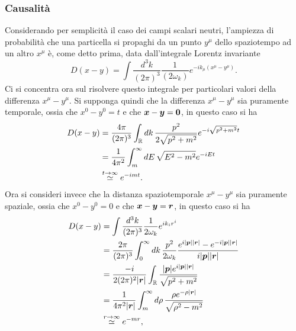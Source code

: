 \subsubsection{Causalità}
Considerando per semplicità il caso dei campi scalari neutri, l'ampiezza di probabilità che una particella si propaghi da un punto $y^\mu$ dello spaziotempo ad un altro $x^\mu$ è, come detto prima, data dall'integrale Lorentz invariante
\begin{equation}
\label{eq: propagatore libero campo scalare carico parziale}
    D(x - y) = \int\frac{d^3k}{(2\pi)^3}\frac{1}{(2\omega_k)}e^{-ik_\mu(x^\mu - y^\mu)}.
\end{equation}
Ci si concentra ora sul risolvere questo integrale per particolari valori della differenza $x^\mu - y^\mu$. Si supponga quindi che la differenza $x^\mu - y^\mu$ sia puramente temporale, ossia che $x^0 - y^0 = t$ e che $\bm{x} -\bm{y} = \bm{0}$, in questo caso si ha
\begin{equation}
    \begin{split}
        D(x - y) &= \frac{4\pi}{(2\pi)^{3}}\int_{\mathbb{R}} dk\,\frac{p^2}{2\sqrt{p^2 + m^2}}e^{-i\sqrt{p^2 + m^2}t} \\
        &=\frac{1}{4\pi^2}\int_m^\infty dE\, \sqrt{E^2 - m^2}e^{-iEt} \\
        &\overset{t\to\infty}{\simeq} e^{-imt}.
    \end{split}
\end{equation}
Ora si consideri invece che la distanza spaziotemporale $x^\mu - y^\mu$ sia puramente spaziale, ossia che $x^0 - y^0 = 0$ e che $\bm{x} -\bm{y} = \bm{r}$, in questo caso si ha
\begin{equation}
    \begin{split}
        D(x - y) &= \int\frac{d^3k}{(2\pi)^3}\frac{1}{2\omega_k}e^{ik_ir^i} \\
        &= \frac{2\pi}{(2\pi)^3}\int_0^\infty dk\,\frac{p^2}{2\omega_k}\frac{e^{i|\bm{p}||\bm{r}|} - e^{-i|\bm{p}||\bm{r}|}}{i|\bm{p}||\bm{r}|} \\ 
        &= \frac{-i}{2(2\pi)^2|\bm{r}|}\int_{\mathbb{R}} \frac{|\bm{p}|e^{i|\bm{p}||\bm{r}|}}{\sqrt{p^2 + m^2}}\\
        &=\frac{1}{4\pi^2|\bm{r}|}\int_m^\infty d\rho\,\frac{\rho e^{-\rho|\bm{r}|}}{\sqrt{\rho^2 - m^2}} \\
        &\overset{r\to\infty}{\simeq} e^{-mr},
    \end{split}
\end{equation}
